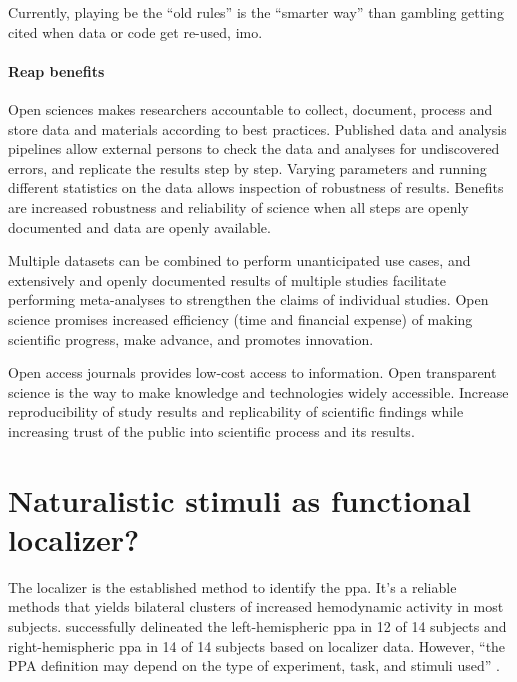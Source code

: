 %
Currently, playing be the ``old rules'' is the ``smarter way'' than gambling
getting cited when data or code get re-used, imo.



\paragraph{Reap benefits}

%
Open sciences makes researchers accountable to collect, document, process and
store data and materials according to best practices.
%
Published data and analysis pipelines allow external persons to check the data
and analyses for undiscovered errors, and replicate the results step by step.
%
Varying parameters and running different statistics on the data allows
inspection of robustness of results.
%
Benefits are increased robustness and reliability of science when all steps are
openly documented and data are openly available.

%
Multiple datasets can be combined to perform unanticipated use cases, and
extensively and openly documented results of multiple studies facilitate
performing meta-analyses to strengthen the claims of individual studies.
%
Open science promises increased efficiency (time and financial expense) of
making scientific progress, make advance, and promotes innovation.

%
Open access journals provides low-cost access to information.
%
Open transparent science is the way to make knowledge and technologies
widely accessible.
%
Increase reproducibility of study results and replicability of scientific
findings while increasing trust of the public into scientific process and its
results.



\pagebreak



\section{Naturalistic stimuli as functional localizer?}



%
The localizer is the established method to identify the \ac{ppa}.
It's a reliable methods that yields bilateral clusters of increased hemodynamic
activity in most subjects.
%
\citet{sengupta2016extension} successfully delineated the left-hemispheric
\ac{ppa} in 12 of 14 subjects and right-hemispheric \ac{ppa} in 14 of 14
subjects based on localizer data.
%
However, ``the PPA definition may depend on the type of experiment, task, and
stimuli used'' \citep{weiner2018defining}.


